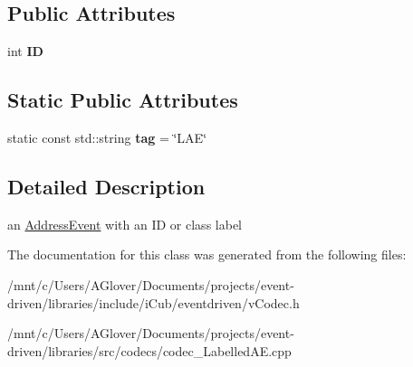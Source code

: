 \subsection*{Public Attributes}
\begin{DoxyCompactItemize}
\item 
\mbox{\label{classev_1_1LabelledAE_a59a295976cdf867006deea22d7cf1942}} 
int {\bfseries ID}
\end{DoxyCompactItemize}
\subsection*{Static Public Attributes}
\begin{DoxyCompactItemize}
\item 
\mbox{\label{classev_1_1LabelledAE_a825f9f0819046248ce7f6d0af4871cec}} 
static const std\+::string {\bfseries tag} = \char`\"{}L\+AE\char`\"{}
\end{DoxyCompactItemize}


\subsection{Detailed Description}
an \hyperlink{classev_1_1AddressEvent}{Address\+Event} with an ID or class label 

The documentation for this class was generated from the following files\+:\begin{DoxyCompactItemize}
\item 
/mnt/c/\+Users/\+A\+Glover/\+Documents/projects/event-\/driven/libraries/include/i\+Cub/eventdriven/v\+Codec.\+h\item 
/mnt/c/\+Users/\+A\+Glover/\+Documents/projects/event-\/driven/libraries/src/codecs/codec\+\_\+\+Labelled\+A\+E.\+cpp\end{DoxyCompactItemize}
